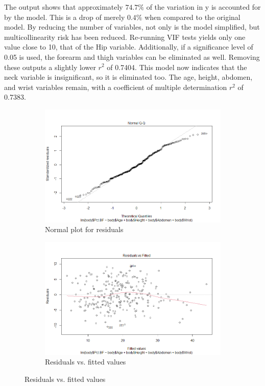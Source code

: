 \documentclass[12pt]{article}
\begin{document}
The output shows that approximately $74.7\%$ of the variation in y is accounted for by the model. This is a drop of merely $0.4\%$ when compared to the original model. By reducing the number of variables, not only is the model simplified, but multicollinearity risk has been reduced. Re-running VIF tests yields only one value close to 10, that of the Hip variable. Additionally, if a significance level of 0.05 is used, the forearm and thigh variables can be eliminated as well. Removing these outputs a  slightly lower $r^2$ of 0.7404. This model now indicates that the neck variable is insignificant, so it is eliminated too. The age, height, abdomen, and wrist variables remain, with a coefficient of multiple determination $r^2$ of 0.7383. 

\begin{figure}
\begin{subfigure}{.45\textwidth}
  \centering
  \includegraphics[width=.8\linewidth]{normqq2.png}  
  \caption{Normal plot for residuals}
  \label{fig:sub-first}
\end{subfigure}
\begin{subfigure}{.45\textwidth}
  \centering
  \includegraphics[width=.8\linewidth]{residvfit2.png}  
  \caption{Residuals vs. fitted values}
  \label{fig:sub-second}
\end{subfigure}


\end{figure}
\end{document}
